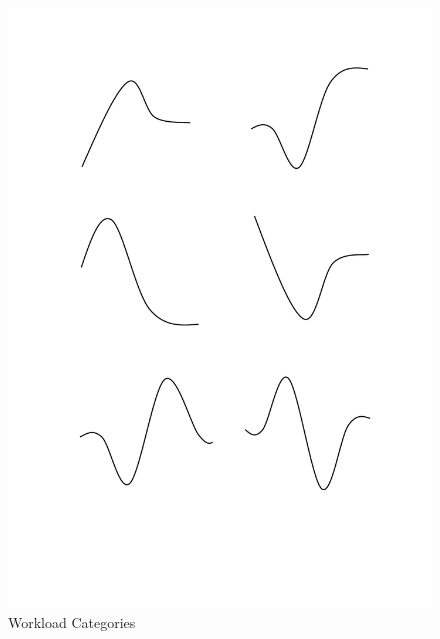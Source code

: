 \begin{figure}[th]
    \centering
    \includegraphics[clip, trim=3cm 5cm 3cm 2cm]{workload-type.pdf}
    \caption{Workload Categories}
    \label{fig:workload}
\end{figure}

